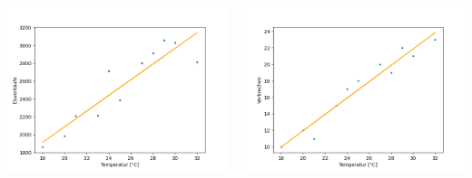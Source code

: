 \documentclass{beamer}
\begin{document}
\begin{frame}
\begin{columns}
\begin{column}{0.5\linewidth}
\begin{center}
	\includegraphics[width=1.1\linewidth]{Temperatur vs Eisverkäufe.png}
\end{center}
\end{column}
\begin{column}{0.5\linewidth}
\begin{center}
	\includegraphics[width=1.1\linewidth]{Temperatur vs Taschendiebstähle.png}
\end{center}
\end{column}
\end{columns}
\end{frame}
\end{document}
